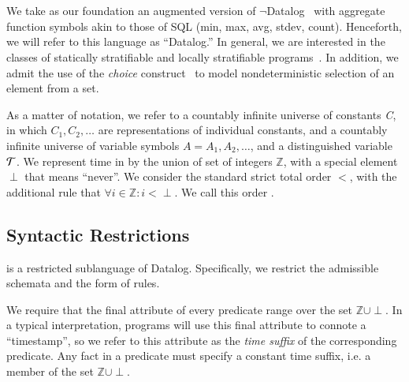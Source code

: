 \section{\lang}
We take as our foundation an augmented version of
$\lnot$Datalog~\cite{ullmanbook} with aggregate function symbols akin to those
of SQL (min, max, avg, stdev, count).  Henceforth, we will refer to this
language as ``Datalog.'' In general, we are interested in the classes of
statically stratifiable and locally stratifiable programs~\cite{prz}.  In
addition, we admit the use of the \emph{choice} construct~\cite{greedychoice,
eventchoice} to model nondeterministic selection of an element from a set.  

As a matter of notation, we refer to a countably infinite universe of constants
\emph{C}, in which $C_{1}, C_{2}, \ldots$ are representations of individual
constants, and a countably infinite universe of variable symbols $A = A_1, A_2,
\ldots$, and a distinguished variable $\Tau$. 
We represent time in \lang by the union of set of integers $\mathbb{Z}$, with a
special element $\perp$ that means ``never''.  We consider the standard strict
total order $<$, with the additional rule that $\forall i \in \mathbb{Z}: i <
\perp$.  We call this order .


\subsection{Syntactic Restrictions}

\lang is a restricted sublanguage of Datalog.  Specifically, we
restrict the admissible schemata and the form of rules.

We require that the final attribute of every \lang
predicate range over the set $\mathbb{Z} \cup \perp$.  In a typical
interpretation, \slang programs will use this final attribute to connote a
``timestamp'', so we refer to this attribute as the \emph{time suffix} of the
corresponding predicate.  Any fact in a \lang predicate must specify a
constant time suffix, i.e. a member of the set $\mathbb{Z} \cup \perp$.


